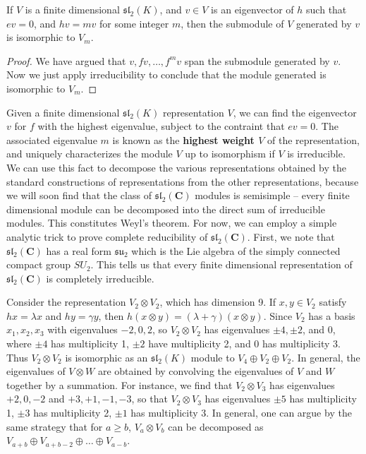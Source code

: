 \begin{corollary}
    If $V$ is a finite dimensional $\mathfrak{sl}_2(K)$, and $v \in V$ is an eigenvector of $h$ such that $ev = 0$, and $hv = mv$ for some integer $m$, then the submodule of $V$ generated by $v$ is isomorphic to $V_m$.
\end{corollary}
\begin{proof}
    We have argued that $v, fv, \dots, f^m v$ span the submodule generated by $v$. Now we just apply irreducibility to conclude that the module generated is isomorphic to $V_m$.
\end{proof}

Given a finite dimensional $\mathfrak{sl}_2(K)$ representation $V$, we can find the eigenvector $v$ for $f$ with the highest eigenvalue, subject to the contraint that $ev = 0$. The associated eigenvalue $m$ is known as the {\bf highest weight $V$} of the representation, and uniquely characterizes the module $V$ up to isomorphism if $V$ is irreducible. We can use this fact to decompose the various representations obtained by the standard constructions of representations from the other representations, because we will soon find that the class of $\mathfrak{sl}_2(\mathbf{C})$ modules is semisimple -- every finite dimensional module can be decomposed into the direct sum of irreducible modules. This constitutes Weyl's theorem. For now, we can employ a simple analytic trick to prove complete reducibility of $\mathfrak{sl}_2(\mathbf{C})$. First, we note that $\mathfrak{sl}_2(\mathbf{C})$ has a real form $\mathfrak{su}_2$ which is the Lie algebra of the simply connected compact group $SU_2$. This tells us that every finite dimensional representation of $\mathfrak{sl}_2(\mathbf{C})$ is completely irreducible.

\begin{example}
    Consider the representation $V_2 \otimes V_2$, which has dimension 9. If $x, y \in V_2$ satisfy $hx = \lambda x$ and $hy = \gamma y$, then $h(x \otimes y) = (\lambda + \gamma) (x \otimes y)$. Since $V_2$ has a basis $x_1, x_2, x_3$ with eigenvalues $-2, 0, 2$, so $V_2 \otimes V_2$ has eigenvalues $\pm4, \pm2$, and $0$, where $\pm 4$ has multiplicity 1, $\pm 2$ have multiplicity 2, and 0 has multiplicity 3. Thus $V_2 \otimes V_2$ is isomorphic as an $\mathfrak{sl}_2(K)$ module to $V_4 \oplus V_2 \oplus V_2$. In general, the eigenvalues of $V \otimes W$ are obtained by convolving the eigenvalues of $V$ and $W$ together by a summation. For instance, we find that $V_2 \otimes V_3$ has eigenvalues $+2,0,-2$ and $+3,+1,-1,-3$, so that $V_2 \otimes V_3$ has eigenvalues $\pm 5$ has multiplicity 1, $\pm 3$ has multiplicity 2, $\pm 1$ has multiplicity 3. In general, one can argue by the same strategy that for $a \geq b$, $V_a \otimes V_b$ can be decomposed as $V_{a+b} \oplus V_{a+b-2} \oplus \dots \oplus V_{a-b}$.
\end{example}

